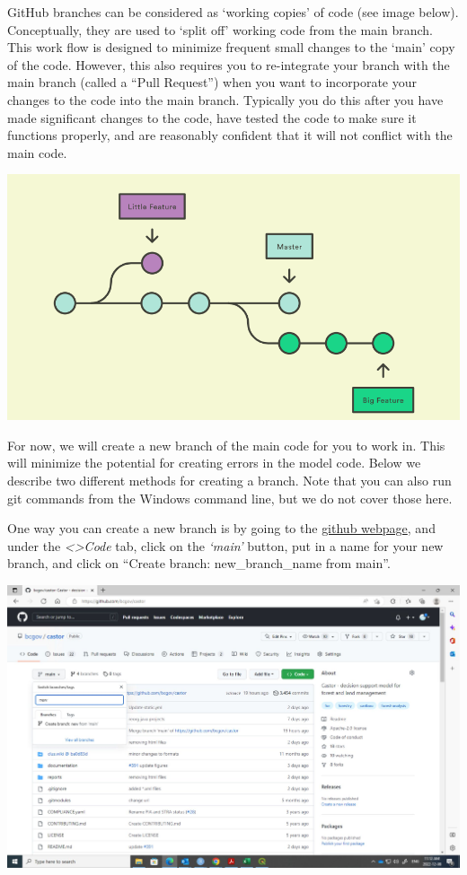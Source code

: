 \documentclass[
]{article}
\begin{document}
GitHub branches can be considered as `working copies' of code (see image
below). Conceptually, they are used to `split off' working code from the
main branch. This work flow is designed to minimize frequent small
changes to the `main' copy of the code. However, this also requires you
to re-integrate your branch with the main branch (called a ``Pull
Request'') when you want to incorporate your changes to the code into
the main branch. Typically you do this after you have made significant
changes to the code, have tested the code to make sure it functions
properly, and are reasonably confident that it will not conflict with
the main code.

\includegraphics{images/github_branch.png}

For now, we will create a new branch of the main code for you to work
in. This will minimize the potential for creating errors in the model
code. Below we describe two different methods for creating a branch.
Note that you can also run git commands from the Windows command line,
but we do not cover those here.

One way you can create a new branch is by going to the
\href{https://github.com/bcgov/clus}{github webpage}, and under the
\emph{\textless\textgreater Code} tab, click on the \emph{`main'}
button, put in a name for your new branch, and click on ``Create branch:
new\_branch\_name from main''.

\includegraphics{images/github_newbranch.jpg}
\end{document}
